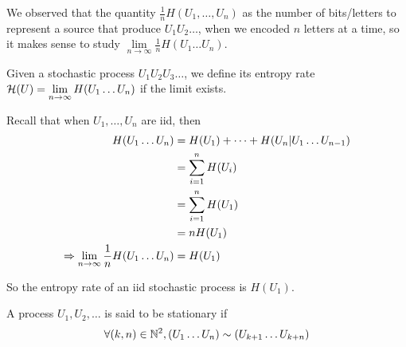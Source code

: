 We observed that the quantity $\frac{1}{n}H(U_1,\ldots,U_n)$ as the number of bits/letters to represent a source that produce $U_1U_2\ldots$, when we encoded $n$ letters at a time, so it makes sense to study $\lim\limits_{n\to\infty} \frac{1}{n} H(U_1\ldots U_n)$.

\begin{definition}
    Given a stochastic process $U_1U_2U_3\ldots$, we define its entropy rate $\mathcal{H}(U) = \lim\limits_{n\to\infty} H(U_1\ldots U_n)$ if the limit exists.
\end{definition}

Recall that when $U_1,\ldots,U_n$ are iid, then
\[
    \begin{aligned}
        H(U_1\ldots U_n) &= H(U_1)+ \cdots + H(U_n\vert U_1\ldots U_{n-1})\\
        &= \sum\limits_{i=1}^n H(U_i)\\
        &= \sum\limits_{i=1}^n H(U_1)\\
        &= nH(U_1)\\
        \Rightarrow \lim\limits_{n\to\infty} \frac{1}{n} H(U_1\ldots U_n) &= H(U_1)
    \end{aligned}
\]

So the entropy rate of an iid stochastic process is $H(U_1)$.

\begin{definition}
    A process $U_1,U_2,\ldots$ is said to be stationary if
    \[
        \forall (k,n)\in\mathbb{N}^2, (U_1\ldots U_n) \sim (U_{k+1}\ldots U_{k+n})
    \]
\end{definition}


